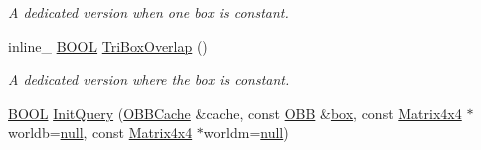 \begin{DoxyCompactItemize}
\begin{DoxyCompactList}\small\item\em A dedicated version when one box is constant. \end{DoxyCompactList}\item 
\hypertarget{class_o_b_b_collider_ac43f039d69c1aa61c26b1b7591e56412}{inline\+\_\+ \hyperlink{_ice_types_8h_a050c65e107f0c828f856a231f4b4e788}{B\+O\+O\+L} \hyperlink{class_o_b_b_collider_ac43f039d69c1aa61c26b1b7591e56412}{Tri\+Box\+Overlap} ()}\label{class_o_b_b_collider_ac43f039d69c1aa61c26b1b7591e56412}

\begin{DoxyCompactList}\small\item\em A dedicated version where the box is constant. \end{DoxyCompactList}\item 
\hyperlink{_ice_types_8h_a050c65e107f0c828f856a231f4b4e788}{B\+O\+O\+L} \hyperlink{class_o_b_b_collider_abf8598e360a0653cd51f4cfe18144bc0}{Init\+Query} (\hyperlink{struct_o_b_b_cache}{O\+B\+B\+Cache} \&cache, const \hyperlink{class_o_b_b}{O\+B\+B} \&\hyperlink{structbox}{box}, const \hyperlink{class_matrix4x4}{Matrix4x4} $\ast$worldb=\hyperlink{_ice_types_8h_ac97b8ee753e4405397a42ad5799b0f9e}{null}, const \hyperlink{class_matrix4x4}{Matrix4x4} $\ast$worldm=\hyperlink{_ice_types_8h_ac97b8ee753e4405397a42ad5799b0f9e}{null})
\end{DoxyCompactItemize}
